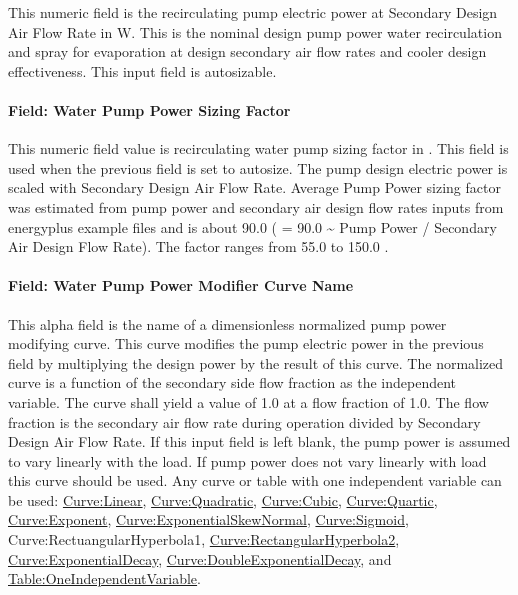 This numeric field is the recirculating pump electric power at Secondary Design Air Flow Rate in W. This is the nominal design pump power water recirculation and spray for evaporation at design secondary air flow rates and cooler design effectiveness. This input field is autosizable.

\paragraph{Field: Water Pump Power Sizing Factor}\label{field-water-pump-power-sizing-factor-1}

This numeric field value is recirculating water pump sizing factor in \si{\wattperVolumeFlowRate}. This field is used when the previous field is set to autosize. The pump design electric power is scaled with Secondary Design Air Flow Rate. Average Pump Power sizing factor was estimated from pump power and secondary air design flow rates inputs from energyplus example files and is about 90.0 \si{\wattperVolumeFlowRate} ( = 90.0 \textasciitilde{} Pump Power / Secondary Air Design Flow Rate). The factor ranges from 55.0 to 150.0 \si{\wattperVolumeFlowRate}.

\paragraph{Field: Water Pump Power Modifier Curve Name}\label{field-water-pump-power-modifier-curve-name-1}

This alpha field is the name of a dimensionless normalized pump power modifying curve. This curve modifies the pump electric power in the previous field by multiplying the design power by the result of this curve. The normalized curve is a function of the secondary side flow fraction as the independent variable. The curve shall yield a value of 1.0 at a flow fraction of 1.0. The flow fraction is the secondary air flow rate during operation divided by Secondary Design Air Flow Rate. If this input field is left blank, the pump power is assumed to vary linearly with the load. If pump power does not vary linearly with load this curve should be used. Any curve or table with one independent variable can be used: \hyperref[curvelinear]{Curve:Linear}, \hyperref[curvequadratic]{Curve:Quadratic}, \hyperref[curvecubic]{Curve:Cubic}, \hyperref[curvequartic]{Curve:Quartic}, \hyperref[curveexponent]{Curve:Exponent}, \hyperref[curveexponentialskewnormal]{Curve:ExponentialSkewNormal}, \hyperref[curvesigmoid]{Curve:Sigmoid}, Curve:RectuangularHyperbola1, \hyperref[curverectangularhyperbola2]{Curve:RectangularHyperbola2}, \hyperref[curveexponentialdecay]{Curve:ExponentialDecay}, \hyperref[curvedoubleexponentialdecay]{Curve:DoubleExponentialDecay}, and \hyperref[tableoneindependentvariable]{Table:OneIndependentVariable}.

